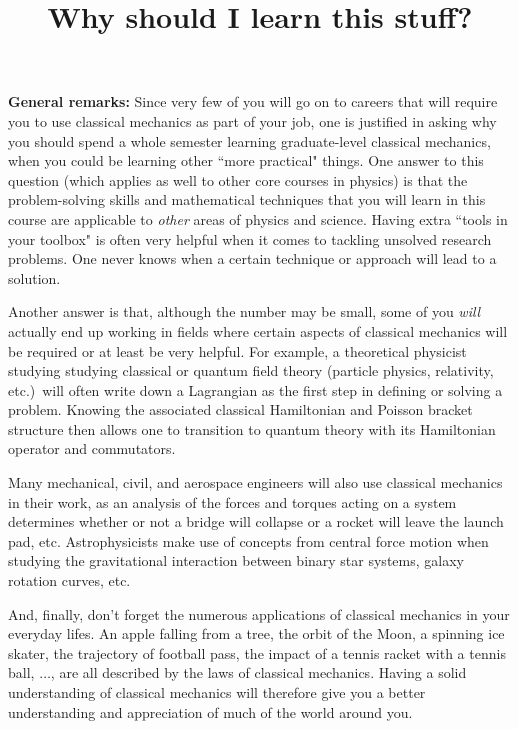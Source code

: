 \documentclass[10pt]{article}
\numberwithin{equation}{section}
\begin{document}
\setlength{\parindent}{0pt}
\setlength{\parskip}{\medskipamount}

\title{Why should I learn this stuff?}
\maketitle

{\bf General remarks:}
Since very few of you will go on to careers that will 
require you to use classical mechanics as part of your
job, one is justified in asking why you should spend a 
whole semester learning graduate-level classical mechanics, 
when you could be learning other ``more practical" things.
One answer to this question (which applies as well to 
other core courses in physics) is that the problem-solving 
skills and mathematical techniques that you will learn 
in this course are applicable to {\em other} areas 
of physics and science.
Having extra ``tools in your toolbox" is often very helpful
when it comes to tackling unsolved research problems.
One never knows when a certain technique or approach will 
lead to a solution.

Another answer is that, although the number may be small,
some of you {\em will} actually 
end up working in fields where certain aspects of classical 
mechanics will be required or at least be very helpful.
For example, a theoretical physicist studying studying 
classical or quantum field theory (particle physics, 
relativity, etc.)\ will often write 
down a Lagrangian as the first step in defining or 
solving a problem. 
Knowing the associated classical Hamiltonian and 
Poisson bracket structure then allows one to transition 
to quantum theory with its Hamiltonian operator and commutators.

Many mechanical, civil, and aerospace engineers 
will also use classical mechanics in their work, as an analysis 
of the forces and torques acting on a system determines 
whether or not a bridge will collapse or a rocket will leave 
the launch pad, etc.
Astrophysicists make use of concepts from central force 
motion when studying the gravitational interaction between 
binary star systems, galaxy rotation curves, etc.

And, finally, don't forget the numerous applications of
classical mechanics in your everyday lifes.  
An apple falling from a tree, 
the orbit of the Moon, a spinning ice skater,
the trajectory of football pass, the impact of 
a tennis racket with a tennis ball, $\ldots$, are all described 
by the laws of classical mechanics.
Having a solid understanding of classical mechanics will 
therefore give you a better understanding and appreciation 
of much of the world around you.
\end{document}
